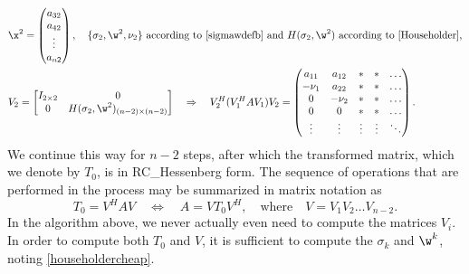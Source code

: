 \begin{align*}
    &\x^{2}=\begin{pmatrix} a_{32} \\ a_{42} \\ \vdots \\ a_{n2} \end{pmatrix}, \quad
    \textrm{$\{\sigma_{2},\w^{2},\nu_{2}\}$ according to \eqref{sigmawdefb} and $H(\sigma_{2},\w^{2})$
    according to \eqref{Householder},}\\
    &V_{2}=\begin{bmatrix} I_{2\times 2} & 0 \\ 0 & H(\sigma_{2},\w^{2})_{(n-2)\times (n-2)} \end{bmatrix}
    \quad \Rightarrow \quad
    V_{2}^{H}(V_{1}^{H}A V_{1})V_{2}=\begin{pmatrix} a_{11} & a_{12} & * & * & \hdots \\
				      -\nu_{1}   & a_{22} & * & * & \hdots \\
				      0          & -\nu_{2} & * & * & \hdots \\
				      0          & 0 & * & * & \hdots \\
				      \vdots     & \vdots & \vdots & \vdots & \ddots \end{pmatrix}.
\end{align*}
We continue this way for $n-2$ steps, after which the transformed
matrix, which we denote by $T_0$, is in RC_Hessenberg form.  The
sequence of operations that are performed in the process may be
summarized in matrix notation as
\begin{equation*}
    T_0=V^{H} A V \quad \Leftrightarrow \quad A=V T_0 V^{H}, \quad
    \textrm{where} \quad V=V_{1}V_{2}\hdots V_{n-2}.
\end{equation*}
In the algorithm above, we never actually even need to compute the
matrices $V_{i}$.  In order to compute both $T_0$ and $V$, it is
sufficient to compute the $\sigma_{k}$ and $\w^{k}$, noting
\eqref{householdercheap}.

